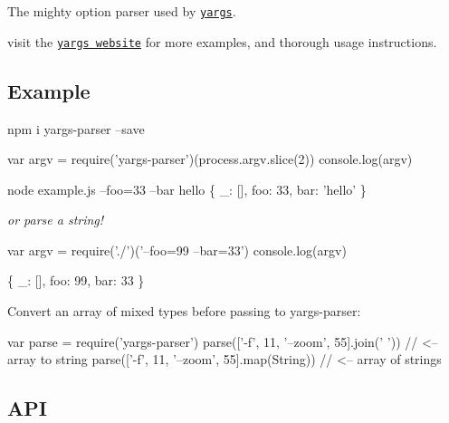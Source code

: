 \href{https://travis-ci.org/yargs/yargs-parser}{\tt } \href{https://coveralls.io/r/yargs/yargs-parser?branch=master}{\tt } \href{https://www.npmjs.com/package/yargs-parser}{\tt } \href{https://ci.appveyor.com/project/bcoe/yargs-parser}{\tt } \href{https://github.com/conventional-changelog/standard-version}{\tt }

The mighty option parser used by \href{https://github.com/yargs/yargs}{\tt yargs}.

visit the \href{http://yargs.js.org/}{\tt yargs website} for more examples, and thorough usage instructions.



\subsection*{Example}


\begin{DoxyCode}
npm i yargs-parser --save
\end{DoxyCode}



\begin{DoxyCode}
var argv = require('yargs-parser')(process.argv.slice(2))
console.log(argv)
\end{DoxyCode}



\begin{DoxyCode}
node example.js --foo=33 --bar hello
\{ \_: [], foo: 33, bar: 'hello' \}
\end{DoxyCode}


{\itshape or parse a string!}


\begin{DoxyCode}
var argv = require('./')('--foo=99 --bar=33')
console.log(argv)
\end{DoxyCode}



\begin{DoxyCode}
\{ \_: [], foo: 99, bar: 33 \}
\end{DoxyCode}


Convert an array of mixed types before passing to {\ttfamily yargs-\/parser}\+:


\begin{DoxyCode}
var parse = require('yargs-parser')
parse(['-f', 11, '--zoom', 55].join(' '))   // <-- array to string
parse(['-f', 11, '--zoom', 55].map(String)) // <-- array of strings
\end{DoxyCode}


\subsection*{A\+PI}

